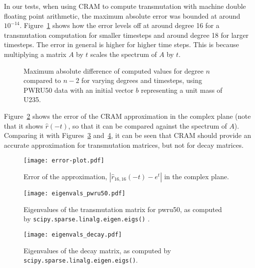In our tests, when using CRAM to compute transmutation with machine double
floating point arithmetic, the maximum absolute error was bounded at around
$10^{-14}$. Figure~\ref{fig:degrees} shows how the error levels off at around
degree 16 for a transmutation computation for smaller timesteps and around
degree 18 for larger timesteps. The error in general is higher for higher time
steps. This is because multiplying a matrix $A$ by $t$ scales the spectrum of
$A$ by $t$.

\begin{figure}[!ht]
\centering
\resizebox{0.9\textwidth}{!}{}
\caption{Maximum absolute difference of computed values for degree $n$
  compared to $n-2$ for varying degrees and timesteps, using PWRU50 data with
  an initial vector $b$ representing a unit mass of U235.}
\label{fig:degrees}
\end{figure}

Figure~\ref{fig:error-plot} shows the error of the CRAM approximation in the
complex plane (note that it shows $\hat{r}(-t)$, so that it can be compared
against the spectrum of $A$). Comparing it with
Figures~\ref{fig:eigenvals-pwru50} and~\ref{fig:eigenvals-decay}, it can be
seen that CRAM should provide an accurate approximation for transmutation
matrices, but not for decay matrices.

\begin{figure}[!ht]
\centering
\texttt{[image: error-plot.pdf]}
\caption{Error of the approximation, $\left |\hat{r}_{16,16}(-t) - e^{t}\right
  |$ in the complex plane. }
\label{fig:error-plot}
\end{figure}

\begin{figure}[!ht]
\centering
\texttt{[image: eigenvals\_pwru50.pdf]}
\caption{Eigenvalues of the transmutation matrix for pwru50, as computed by
  \texttt{scipy.\allowbreak{}sparse.\allowbreak{}linalg.\allowbreak{}eigen.\allowbreak{}eigs()}
  .}
\label{fig:eigenvals-pwru50}
\end{figure}

\begin{figure}[!ht]
\centering
\texttt{[image: eigenvals\_decay.pdf]}
\caption{Eigenvalues of the decay matrix, as computed by
  \texttt{scipy.\allowbreak{}sparse.\allowbreak{}linalg.\allowbreak{}eigen.\allowbreak{}eigs()}.}
\label{fig:eigenvals-decay}
\end{figure}
